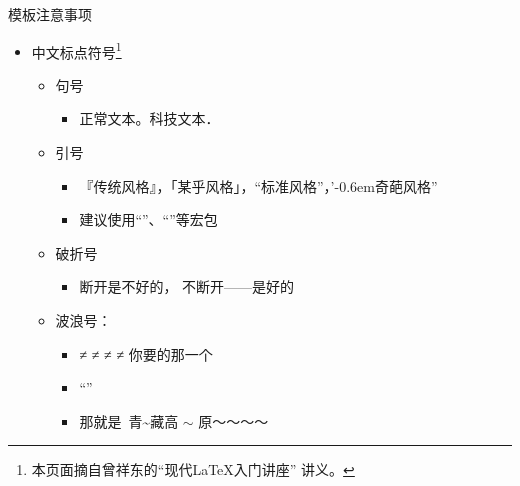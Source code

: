 \documentclass[fontset = none, xcolor=svgnames, t, aspectratio=169]{ctexbeamer}
\begin{document}
\begin{frame}[fragile]{\nwafuthesis 模板}{注意事项}
  \stretchon
  \begin{itemize}
  \item 中文标点符号\footnote[frame,1]{本页面摘自曾祥东的\enquote{现代\LaTeX 入门讲座}
      讲义。}
    \begin{itemize}
    \item 句号
      \begin{itemize}
      \item 正常文本。科技文本．
      \end{itemize}
    \item 引号
      \begin{itemize}
      \item 『传统风格』，「某乎风格」，“标准风格”，\mbox{}’\kern-0.6em奇葩风格”
      \item 建议使用\enquote{}、\enquote{}等宏包
      \end{itemize}
    \item 破折号
      \begin{itemize}
      \item 断开{\SourceHanSerif{}}是不好的，
        不断开——是好的
      \end{itemize}
    \item 波浪号：
      \begin{itemize}
      \item \texinline{~} ≠ \texinline{\textasciitilde} ≠
        \texinline{\texttildelow} ≠ \texinline{$\sim$} ≠ 你要的那一个
      \item \enquote{}
      \item 那就是~青\textasciitilde 藏\texttildelow 高 $\sim$ 原～～～～
      \end{itemize}
    \end{itemize}
  \end{itemize}
  \stretchoff
\end{frame}
\end{document}

